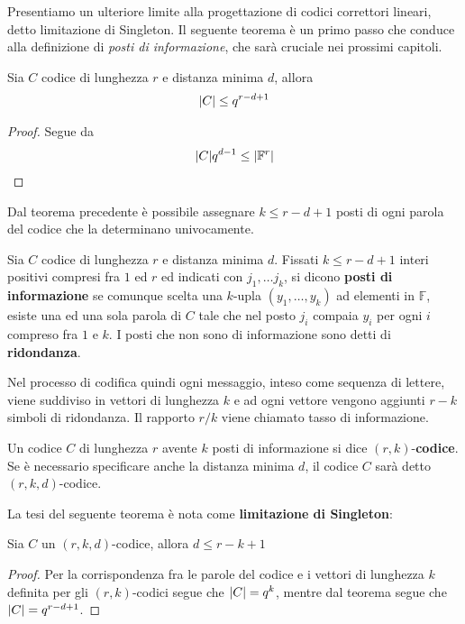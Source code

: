 Presentiamo un ulteriore limite alla progettazione di codici correttori lineari, detto limitazione di Singleton. Il seguente teorema è un primo passo che conduce alla definizione di \emph{posti di informazione}, che sarà cruciale nei prossimi capitoli.
\begin{teorema}\label{cap2_1:teolimitecodici}
   Sia $C$ codice di lunghezza $r$ e distanza minima $d$, allora
   \begin{align*}
      \arrowvert C \arrowvert \leq q^{r-d+1}
   \end{align*}
\end{teorema}
\begin{proof}
   Segue da
   \begin{align*}
      \arrowvert C \arrowvert q^{d-1} \leq \arrowvert \mathbb{F}^{r} \arrowvert
   \end{align*}
\end{proof}
\noindent
Dal teorema precedente è possibile assegnare $k \leq r-d+1$ posti di ogni parola del codice che la determinano univocamente.
\begin{definizione}
   Sia $C$ codice di lunghezza $r$ e distanza minima $d$. Fissati $k \leq r-d+1$ interi positivi compresi fra $1$ ed $r$ ed indicati con $j_1, \dots j_k$, si dicono {\bf posti di informazione} se comunque scelta una $k$-upla $(y_1,\dots , y_k)$ ad elementi in $\mathbb{F}$, esiste una ed una sola parola di $C$ tale che nel posto $j_i$ compaia $y_i$ per ogni $i$ compreso fra $1$ e $k$. I posti che non sono di informazione sono detti di {\bf ridondanza}.
\end{definizione}
\noindent
Nel processo di codifica quindi ogni messaggio, inteso come sequenza di lettere, viene suddiviso in vettori di lunghezza $k$ e ad ogni vettore vengono aggiunti $r-k$ simboli di ridondanza. Il rapporto $r/k$ viene chiamato tasso di informazione.
\begin{definizione}
   Un codice $C$ di lunghezza $r$ avente $k$ posti di informazione si dice $(r,k)$-{\bf codice}. Se è necessario specificare anche la distanza minima $d$, il codice $C$ sarà detto $(r,k,d)$-codice.
\end{definizione}
\noindent
La tesi del seguente teorema è nota come {\bf limitazione di Singleton}:
\begin{teorema}
   Sia $C$ un $(r,k,d)$-codice, allora $d\leq r-k+1$
\end{teorema}
\begin{proof}
   Per la corrispondenza fra le parole del codice e i vettori di lunghezza $k$ definita per gli $(r,k)$-codici segue che $\arrowvert C \arrowvert = q^k$, mentre dal teorema segue che $\arrowvert C \arrowvert = q^{r-d+1}$.
\end{proof}

